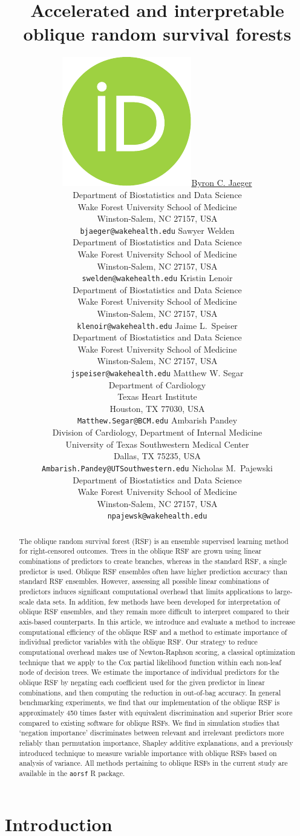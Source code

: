\documentclass{article}\usepackage[]{graphicx}\usepackage[]{xcolor}
\title{Accelerated and interpretable oblique random survival forests}
\author{ \href{https://orcid.org/0000-0001-7399-2299}{\includegraphics[scale=0.06]{orcid.pdf}\hspace{1mm}Byron C. Jaeger} \\
	Department of Biostatistics and Data Science\\
	Wake Forest University School of Medicine\\
	Winston-Salem, NC 27157, USA \\
	\texttt{bjaeger@wakehealth.edu}
	\AND
   Sawyer Welden \\
   Department of Biostatistics and Data Science\\
   Wake Forest University School of Medicine\\
   Winston-Salem, NC 27157, USA \\
   \texttt{swelden@wakehealth.edu}
   \And
   Kristin Lenoir \\
   Department of Biostatistics and Data Science\\
   Wake Forest University School of Medicine\\
   Winston-Salem, NC 27157, USA \\
   \texttt{klenoir@wakehealth.edu}
	 \And
	 Jaime L.~Speiser \\
	 Department of Biostatistics and Data Science\\
	 Wake Forest University School of Medicine\\
	 Winston-Salem, NC 27157, USA \\
	 \texttt{jspeiser@wakehealth.edu}
	 \And
	 Matthew W. Segar \\
   Department of Cardiology \\
   Texas Heart Institute \\
   Houston, TX 77030, USA \\
	 \texttt{Matthew.Segar@BCM.edu}
   \And
	 Ambarish Pandey \\
   Division of Cardiology, Department of Internal Medicine \\
   University of Texas Southwestern Medical Center \\
   Dallas, TX 75235, USA \\
	 \texttt{Ambarish.Pandey@UTSouthwestern.edu}
	 \And
	 Nicholas M.~Pajewski \\
	 Department of Biostatistics and Data Science\\
	 Wake Forest University School of Medicine\\
	 Winston-Salem, NC 27157, USA \\
	 \texttt{npajewsk@wakehealth.edu}
}
\begin{document}
\maketitle




\begin{abstract}

	The oblique random survival forest (RSF) is an ensemble supervised learning method for right-censored outcomes. Trees in the oblique RSF are grown using linear combinations of predictors to create branches, whereas in the standard RSF, a single predictor is used. Oblique RSF ensembles often have higher prediction accuracy than standard RSF ensembles. However, assessing all possible linear combinations of predictors induces significant computational overhead that limits applications to large-scale data sets. In addition, few methods have been developed for interpretation of oblique RSF ensembles, and they remain more difficult to interpret compared to their axis-based counterparts. In this article, we introduce and evaluate a method to increase computational efficiency of the oblique RSF and a method to estimate importance of individual predictor variables with the oblique RSF. Our strategy to reduce computational overhead makes use of Newton-Raphson scoring, a classical optimization technique that we apply to the Cox partial likelihood function within each non-leaf node of decision trees. We estimate the importance of individual predictors for the oblique RSF by negating each coefficient used for the given predictor in linear combinations, and then computing the reduction in out-of-bag accuracy. In general benchmarking experiments, we find that our implementation of the oblique RSF is approximately 450 times faster with equivalent discrimination and superior Brier score compared to existing software for oblique RSFs. We find in simulation studies that `negation importance' discriminates between relevant and irrelevant predictors more reliably than permutation importance, Shapley additive explanations, and a previously introduced technique to measure variable importance with oblique RSFs based on analysis of variance. All methods pertaining to oblique RSFs in the current study are available in the \texttt{aorsf} R package.

\end{abstract}




\section{Introduction}
\end{document}
